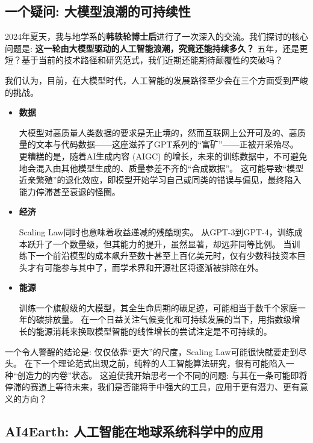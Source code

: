 \documentclass[12pt, a4paper]{article}
\begin{document}
\subsection{一个疑问: 大模型浪潮的可持续性}

2024年夏天，我与地学系的\textbf{韩轶轮博士后}进行了一次深入的交流。我们探讨的核心问题是: \textbf{这一轮由大模型驱动的人工智能浪潮，究竟还能持续多久？}
五年，还是更短？基于当前的技术路径和研究范式，我们近期还能期待颠覆性的突破吗？

我们认为，目前，在大模型时代，人工智能的发展路径至少会在三个方面受到严峻的挑战。

\begin{itemize}

    \item \textbf{数据}

    大模型对高质量人类数据的要求是无止境的，然而互联网上公开可及的、高质量的文本与代码数据——这座滋养了GPT系列的“富矿”——正被开采殆尽。
    更糟糕的是，随着AI生成内容 (AIGC) 的增长，未来的训练数据中，不可避免地会混入由其他模型生成的、质量参差不齐的“合成数据”。
    这可能导致“模型近亲繁殖”的退化效应，即模型开始学习自己或同类的错误与偏见，最终陷入能力停滞甚至衰退的怪圈。

    \item \textbf{经济}

    Scaling Law同时也意味着收益递减的残酷现实。
    从GPT-3到GPT-4，训练成本跃升了一个数量级，但其能力的提升，虽然显著，却远非同等比例。
    当训练下一个前沿模型的成本飙升至数十甚至上百亿美元时，仅有少数科技资本巨头才有可能参与其中了，而学术界和开源社区将逐渐被排除在外。

    \item \textbf{能源}

    训练一个旗舰级的大模型，其全生命周期的碳足迹，可能相当于数千个家庭一年的碳排放量。
    在一个日益关注气候变化和可持续发展的当下，用指数级增长的能源消耗来换取模型智能的线性增长的尝试注定是不可持续的。

\end{itemize}

一个令人警醒的结论是: 仅仅依靠“更大”的尺度，Scaling Law可能很快就要走到尽头。
在下一个理论范式出现之前，纯粹的人工智能算法研究，很有可能陷入一种“创造力的内卷”状态。
这迫使我开始思考一个不同的问题: 与其在一条可能即将停滞的赛道上等待未来，我们是否能将手中强大的工具，应用于更有潜力、更有意义的方向？

\subsection{AI4Earth: 人工智能在地球系统科学中的应用}
\end{document}
